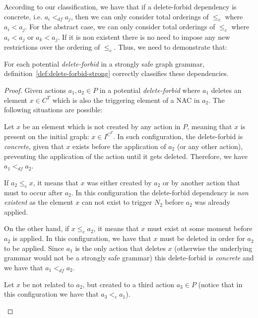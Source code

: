 According to our classification, we have that if a delete-forbid dependency is concrete, i.e. $a_i <_{df} a_j$, then we can only consider total orderings of $\leq_c$ where $a_i < a_j$. For the abstract case, we can only consider total orderings of $\leq_c$ where $a_i < a_j$ or $a_k < a_j$. If it is non existent there is no need to impose any new restrictions over the ordering of $\leq_c$. Thus, we need to demonstrate that:

\begin{thm} For each potential \emph{delete-forbid} in a strongly safe graph grammar, definition~\ref{def:delete-forbid-strong} correctly classifies these dependencies.
\end{thm}

\begin{proof} Given actions $a_1,a_2 \in P$ in a potential \emph{delete-forbid} where $a_1$ deletes an element $x \in C^T$ which is also the triggering element of a NAC in $a_2$. The following situations are possible:
\hfill
\begin{description}[style=nextline,leftmargin=*]

  \item [Triggering element is present on the initial graph:]
Let $x$ be an element which is not created by any action in $P$, meaning that $x$ is present on the initial graph: $x \in I^{C^T}$. In such configuration, the delete-forbid is \emph{concrete}, given that $x$ exists before the application of $a_2$ (or any other action), preventing the application of the action until it gets deleted. Therefore, we have $a_1 <_{df} a_2$.

  \item [Triggering element is related to the action:] If $a_2 \leq_c x$, it means that $x$ was either created by $a_2$ or by another action that must to occur after $a_2$. In this configuration the delete-forbid dependency is \emph{non existent} as the element $x$ can not exist to trigger $N_2$ before $a_2$ was already applied.

    On the other hand, if $x \leq_c a_2$, it means that $x$ must exist at some moment before $a_2$ is applied. In this configuration, we have that $x$ must be deleted in order for $a_2$ to be applied. Since $a_1$ is the only action that deletes $x$ (otherwise the underlying grammar would not be a strongly safe grammar) this delete-forbid is \emph{concrete} and we have that $a_1 <_{df} a_2$.

\item [Triggering element is not related to the action:]
  Let $x$ be not related to $a_2$, but created to a third action $a_3 \in P$ (notice that in this configuration we have that $a_3 <_{c} a_1$).


\end{description}
\end{proof}
